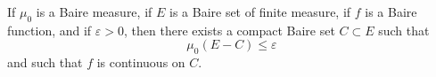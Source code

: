 If $\mu_0$ is a Baire measure, if $E$ is a Baire set of finite measure, if $f$ is a Baire function, and if $\varepsilon > 0$, then there exists a compact Baire set $C \subset E$ such that
$$\mu_0(E - C) \leq \varepsilon$$
and such that $f$ is continuous on $C$.
